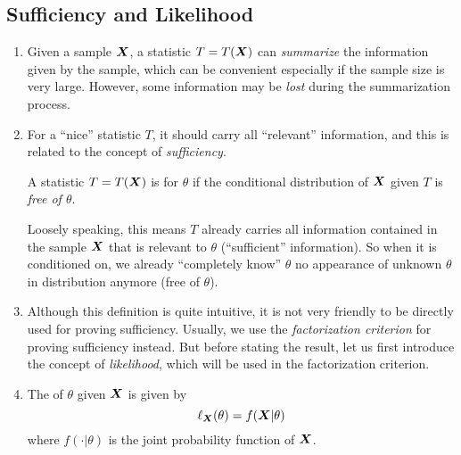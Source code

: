 \subsection{Sufficiency and Likelihood}
\begin{enumerate}
\item Given a sample \(\vb*{X}\), a statistic \(T=T(\vb*{X})\) can
\emph{summarize} the information given by the sample, which can be convenient
especially if the sample size is very large. However, some information may be
\emph{lost} during the summarization process.

\item For a ``nice'' statistic \(T\), it should carry all ``relevant''
information, and this is related to the concept of \emph{sufficiency}.

A statistic \(T=T(\vb*{X})\) is  for \(\theta\) if the
conditional distribution of \(\vb*{X}\) given \(T\) is \emph{free of \(\theta\)}.

\begin{note}
Loosely speaking, this means \(T\) already carries all information contained in
the sample \(\vb*{X}\) that is relevant to \(\theta\) (``sufficient''
information). So when it is conditioned on, we already ``completely know''
\(\theta\)  no appearance of unknown \(\theta\) in
distribution anymore (free of \(\theta\)).
\end{note}

\item Although this definition is quite intuitive, it is not very friendly to
be directly used for proving sufficiency. Usually, we use the
\emph{factorization criterion} for proving sufficiency instead. But before
stating the result, let us first introduce the concept of \emph{likelihood},
which will be used in the factorization criterion.

\item The  of \(\theta\) given \(\vb*{X}\) is given
by
\[\ell_{\vb*{X}}\qty(\theta)=f(\vb*{X}|\theta)\]
where \(f(\cdot|\theta)\) is the joint probability function of \(\vb*{X}\).



\end{enumerate}
